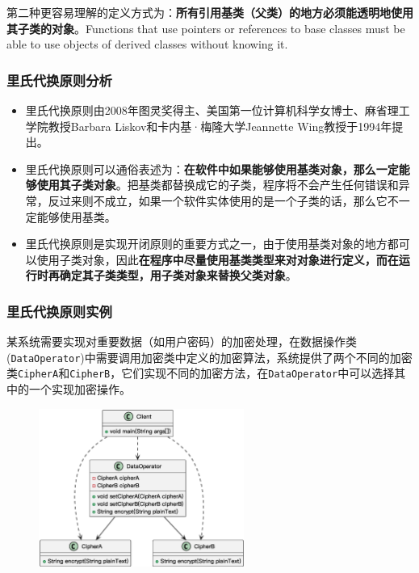 第二种更容易理解的定义方式为：\textbf{所有引用基类（父类）的地方必须能透明地使用其子类的对象}。Functions that use pointers or references to base classes must be able to use objects of derived classes without knowing it.

\subsubsection{里氏代换原则分析}
\begin{itemize}
    \item 里氏代换原则由2008年图灵奖得主、美国第一位计算机科学女博士、麻省理工学院教授Barbara Liskov和卡内基·梅隆大学Jeannette Wing教授于1994年提出。
    \item 里氏代换原则可以通俗表述为：\textbf{在软件中如果能够使用基类对象，那么一定能够使用其子类对象}。把基类都替换成它的子类，程序将不会产生任何错误和异常，反过来则不成立，如果一个软件实体使用的是一个子类的话，那么它不一定能够使用基类。
    \item 里氏代换原则是实现开闭原则的重要方式之一，由于使用基类对象的地方都可以使用子类对象，因此\textbf{在程序中尽量使用基类类型来对对象进行定义，而在运行时再确定其子类类型，用子类对象来替换父类对象}。
\end{itemize}

\subsubsection{里氏代换原则实例}
某系统需要实现对重要数据（如用户密码）的加密处理，在数据操作类(\verb|DataOperator|)中需要调用加密类中定义的加密算法，系统提供了两个不同的加密类\;\verb|CipherA|\;和\;\verb|CipherB|，它们实现不同的加密方法，在\;\verb|DataOperator|\;中可以选择其中的一个实现加密操作。
\begin{figure}[H]
    \vspace{-0.5em}
	\centering
	\includegraphics[width=0.6\textwidth]{images/里氏代换原则实例1.eps}
    \vspace{-1em}
\end{figure}

